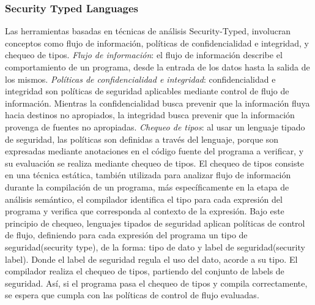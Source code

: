 \subsubsection{Security Typed Languages}
Las herramientas basadas en técnicas de análisis Security-Typed, involucran
conceptos como flujo de información, políticas de confidencialidad e integridad,
y chequeo de tipos.
\emph{Flujo de información}: el flujo de información describe el
comportamiento de un programa, desde la entrada de los datos hasta la salida de
los mismos.\newline 
\emph{Políticas de confidencialidad e integridad}: confidencialidad e integridad
son políticas de seguridad aplicables mediante control de flujo de información.
Mientras la confidencialidad busca prevenir que la información fluya hacia
destinos no apropiados, la integridad busca prevenir que la información provenga
de fuentes no apropiadas\cite{LanguageIFS-2013}.\newline
\emph{Chequeo de tipos}: al usar un lenguaje tipado de seguridad, las políticas
son definidas a través del lenguaje, porque son expresadas mediante anotaciones
en el código fuente del programa a verificar, y su evaluación se realiza
mediante chequeo de tipos.\newline 
El chequeo de tipos consiste en una técnica estática,
también utilizada para analizar flujo de información durante la compilación de
un programa, más específicamente en la etapa de análisis semántico, el
compilador identifica el tipo para cada expresión del programa y verifica que
corresponda al contexto de la expresión.
Bajo este principio de chequeo, lenguajes tipados de seguridad aplican
políticas de control de flujo, definiendo para cada expresión del programa un
tipo de seguridad(security type), de la forma:  tipo de dato y label de
seguridad(security label). Donde el label de seguridad regula el uso del dato,
acorde a su tipo.\newline 
El compilador realiza el chequeo de tipos, partiendo del conjunto de labels de
seguridad. Así, si el programa pasa el chequeo de tipos y compila correctamente,
se espera que cumpla con las políticas de control de flujo evaluadas.
